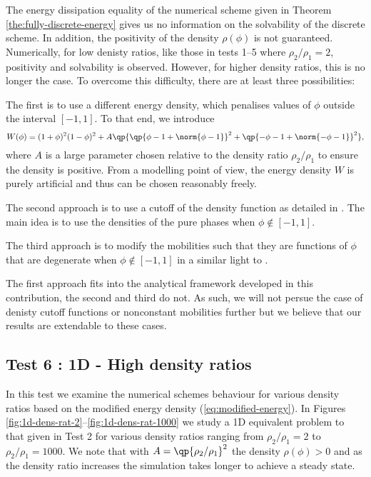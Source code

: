 \documentclass[final]{amsart}
\numberwithin{equation}{section}
\begin{document}
\begin{Rem}
  \label{rem:positive-density}
  {The energy dissipation equality of the numerical scheme
    given in Theorem \ref{the:fully-discrete-energy} gives us no
    information on the solvability of the discrete scheme. In
    addition, the positivity of the density $\rho(\phi)$ is not
    guaranteed. Numerically, for low denisty ratios, like those in
    tests 1--5 where $\rho_2/\rho_1 = 2$, positivity and solvability is
    observed. However, for higher density ratios, this is no longer
    the case. To overcome this difficulty, there are at least three
    possibilities:
  }

  {
    The first is to use a different energy density, which penalises
    values of $\phi$ outside the interval $[-1,1]$. To that end, we
    introduce
    \begin{equation}
      \label{eq:modified-energy}
      W(\phi) = (1+\phi)^2(1-\phi)^2 + A\qp{\qp{\phi - 1 + \norm{\phi - 1}}^2 + \qp{-\phi - 1 + \norm{-\phi-1}}^2},
    \end{equation}
    where $A$ is a large parameter chosen relative to the density
    ratio $\rho_2/\rho_1$ to ensure the density is positive. From a
    modelling point of view, the energy density $W$ is purely
    artificial and thus can be chosen reasonably freely. }

  { The second approach is to use a cutoff of the density
    function as detailed in \cite{Gru}. The main idea is to use the
    densities of the pure phases when $\phi\not\in [-1,1]$.
  }

  { The third approach is to modify the mobilities such that
    they are functions of $\phi$ that are degenerate when $\phi\not\in
    [-1,1]$ in a similar light to \cite{GruRumpf}.
  }

  { The first approach fits into the analytical framework
    developed in this contribution, the second and third do not.  As
    such, we will not persue the case of denisty cutoff functions or
    nonconstant mobilities further but we believe that our results are
    extendable to these cases.}
\end{Rem}

\subsection{Test 6 : 1D - High density ratios}
\label{sec:1d-random}

{ In this test we examine the numerical schemes behaviour
  for various density ratios based on the modified energy density
  (\ref{eq:modified-energy}). In Figures
  \ref{fig:1d-dens-rat-2}--\ref{fig:1d-dens-rat-1000} we study a 1D
  equivalent problem to that given in Test 2 for various density
  ratios ranging from $\rho_2 / \rho_1 = 2$ to $\rho_2 / \rho_1 =
  1000$. We note that with $A = \qp{\rho_2 / \rho_1}^2$ the density
  $\rho(\phi) > 0$ and as the density ratio increases the simulation
  takes longer to achieve a steady state.}
\end{document}

